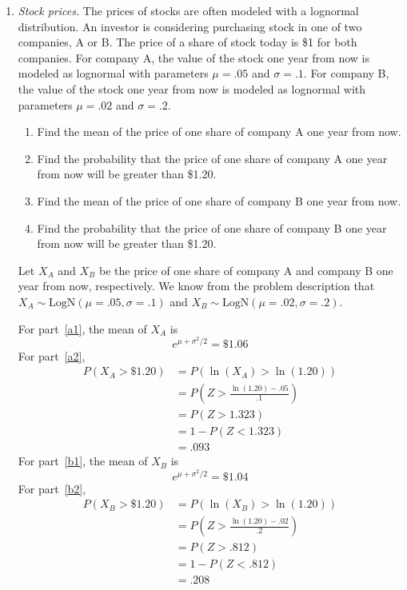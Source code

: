 \begin{enumerate}
\item \emph{Stock prices.} The prices of stocks are often modeled
  with a lognormal distribution. An investor is considering purchasing
  stock in one of two companies, A or B. The price of a share of stock
  today is \$1 for both companies. For company A, the value of the
  stock one year from now is modeled as lognormal with parameters
  $\mu=.05$ and $\sigma=.1$. For company B, the value of the stock one
  year from now is modeled as lognormal with parameters $\mu=.02$ and
  $\sigma=.2$.
\begin{enumerate}
\item Find the mean of the price of one share of company A one year
  from now. \label{a1}
\item Find the probability that the price of one share of company A
  one year from now will be greater than \$1.20. \label{a2}
\item Find the mean of the price of one share of company B one year
  from now. \label{b1}
\item Find the probability that the price of one share of company B
  one year from now will be greater than \$1.20. \label{b2}
\end{enumerate}

\begin{solution}
\bs Let $X_A$ and $X_B$ be the price of one share of company A and
company B one year from now, respectively. We know from the problem
description that $X_A \sim \text{LogN}(\mu=.05,\sigma=.1)$ and $X_B
\sim \text{LogN}(\mu=.02,\sigma=.2)$.

For part~\ref{a1}, the mean of $X_A$ is
\[
e^{\mu + \sigma^2/2} = \$1.06
\]
For part~\ref{a2}, 
\begin{align*}
P(X_A > \$1.20) &= P(\ln(X_A) > \ln(1.20)) \\
&= P\left(Z > \frac{\ln(1.20)-.05}{.1}\right) \\
&= P(Z > 1.323) \\
&= 1-P(Z < 1.323) \\
&= .093
\end{align*}
For part~\ref{b1}, the mean of $X_B$ is
\[
e^{\mu + \sigma^2/2} = \$1.04
\]
For part~\ref{b2}, 
\begin{align*}
P(X_B > \$1.20) &= P(\ln(X_B) > \ln(1.20)) \\
&= P\left(Z > \frac{\ln(1.20)-.02}{.2}\right) \\
&= P(Z > .812) \\
&= 1-P(Z < .812) \\
&= .208
\end{align*}
\end{solution}


\end{enumerate}
